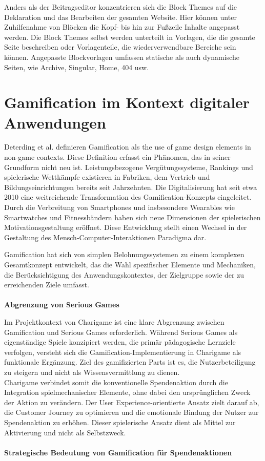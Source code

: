 Anders als der Beitragseditor konzentrieren sich die Block Themes auf die Deklaration und das Bearbeiten der gesamten Website.
Hier können unter Zuhilfenahme von Blöcken die Kopf- bis hin zur Fußzeile Inhalte angepasst werden.
Die Block Themes selbst werden unterteilt in Vorlagen, die die gesamte Seite beschreiben oder Vorlagenteile, die wiederverwendbare Bereiche sein können.
Angepasste Blockvorlagen umfassen statische als auch dynamische Seiten, wie Archive, Singular, Home, 404 usw. \cite{wordpress2024EditorTemplates}


\section{Gamification im Kontext digitaler Anwendungen}

Deterding et al. definieren Gamification als \grqq{}the use of game design elements in non-game contexts\grqq{}. \cite{deterding2011gamification}
Diese Definition erfasst ein Phänomen, das in seiner Grundform nicht neu ist.
Leistungsbezogene Vergütungssysteme, Rankings und spielerische Wettkämpfe existieren in Fabriken, dem Vertrieb und Bildungseinrichtungen bereits seit Jahrzehnten. \cite{bpb2023gamification}
Die Digitalisierung hat seit etwa 2010 eine weitreichende Transformation des Gamification-Konzepts eingeleitet.
Durch die Verbreitung von Smartphones und insbesondere Wearables wie Smartwatches und Fitnessbändern haben sich neue Dimensionen der spielerischen Motivationsgestaltung eröffnet. \cite{sailer2016gamification}
Diese Entwicklung stellt einen Wechsel in der Gestaltung des Mensch-Computer-Interaktionen Paradigma dar.

Gamification hat sich von simplen Belohnungssystemen zu einem komplexen Gesamtkonzept entwickelt, das die Wahl spezifischer Elemente und Mechaniken, die Berücksichtigung des Anwendungskontextes, der Zielgruppe sowie der zu erreichenden Ziele umfasst. \cite{bpb2023gamification}
\\\\
\textbf{Abgrenzung von Serious Games}

Im Projektkontext von Charigame ist eine klare Abgrenzung zwischen Gamification und Serious Games erforderlich.
Während Serious Games als eigenständige Spiele konzipiert werden, die primär pädagogische Lernziele verfolgen, versteht sich die Gamification-Implementierung in Charigame als funktionale Ergänzung.
Ziel des gamifizierten Parts ist es, die Nutzerbeteiligung zu steigern und nicht als Wissensvermittlung zu dienen.
\\
Charigame verbindet somit die konventionelle Spendenaktion durch die Integration spielmechanischer Elemente, ohne dabei den ursprünglichen Zweck der Aktion zu verändern.
Der User Experience-orientierte Ansatz zielt darauf ab, die Customer Journey zu optimieren und die emotionale Bindung der Nutzer zur Spendenaktion zu erhöhen.
Dieser spielerische Ansatz dient als Mittel zur Aktivierung und nicht als Selbstzweck.
\\\\
\textbf{Strategische Bedeutung von Gamification für Spendenaktionen}

